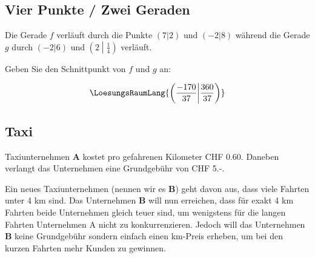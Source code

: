 \subsection{Vier Punkte / Zwei Geraden}
Die Gerade $f$ verläuft durch die Punkte $(7|2)$ und $(-2|8)$ während
die Gerade $g$ durch $(-2|6)$ und $\left(2\middle|\frac14\right)$
verläuft.

Geben Sie den Schnittpunkt von $f$ und $g$ an:

\vspace{15mm}

$$\LoesungsRaumLang{\left( \frac{-170}{37} \middle| \frac{360}{37} \right)}$$

\subsection{Taxi}
Taxiunternehmen \textbf{A} kostet pro gefahrenen Kilometer CHF
0.60. Daneben verlangt das Unternehmen eine Grundgebühr von CHF 5.-.

Ein neues Taxiunternehmen (nennen wir es \textbf{B}) geht davon aus, dass viele Fahrten unter 4 km
sind. Das Unternehmen \textbf{B} will nun erreichen, dass für exakt 4
km Fahrten beide Unternehmen gleich teuer sind, um wenigstens für die
langen Fahrten Unternehmen A nicht zu konkurrenzieren. Jedoch will das
Unternehmen \textbf{B} keine Grundgebühr sondern einfach einen
km-Preis erheben, um bei den kurzen Fahrten mehr Kunden zu gewinnen.

